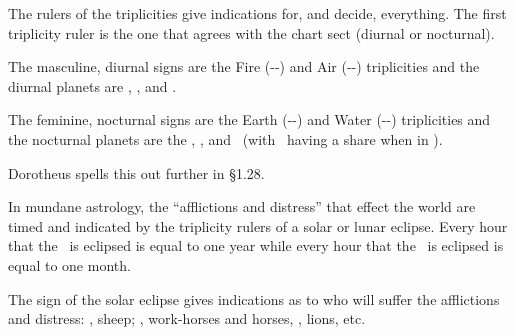 The rulers of the triplicities give indications for, and decide, everything. The first triplicity ruler is the one that agrees with the chart sect (diurnal or nocturnal).

\begin{mdframed}[backgroundcolor=cyan!5, rightmargin=1em, leftmargin=1em]
\footnotesize
The masculine, diurnal signs are the Fire (\Aries-\Leo-\Sagittarius) and Air (\Gemini-\Libra-\Aquarius) triplicities and the diurnal planets are \Sun, \Jupiter, and \Saturn.

The feminine, nocturnal signs are the Earth (\Taurus-\Virgo-\Capricorn) and Water (\Cancer-\Scorpio-\Pisces) triplicities and the nocturnal planets are the \Moon, \Venus, and \Mars\, (with \Mercury\, having a share when in \Virgo).

Dorotheus spells this out further in \S{1.28}.
\end{mdframed}

In mundane astrology, the ``afflictions and distress'' that effect the world are timed and indicated by the triplicity rulers of a solar or lunar eclipse. Every hour that the \Sun\, is eclipsed is equal to one year while every hour that the \Moon\, is eclipsed is equal to one month.

The sign of the solar eclipse gives indications as to who will suffer the afflictions and distress: \Aries, sheep; \Sagittarius, work-horses and horses, \Leo, lions, etc.
